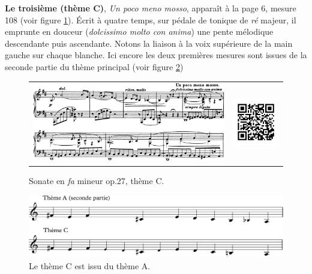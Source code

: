 \textbf{Le troisième (thème C)}, \emph{Un poco meno mosso}, apparaît à la page 6, mesure 108 (voir figure \ref{sonate-theme-3}). Écrit à quatre temps, sur pédale de tonique de \emph{ré} majeur, il emprunte en douceur (\emph{dolcissimo molto con anima}) une pente mélodique descendante puis ascendante. Notons la liaison à la voix supérieure de la main gauche sur chaque blanche. Ici encore les deux premières mesures sont issues de la seconde partie du thème principal (voir figure \ref{sonate-theme-1-vs-3})

\begin{figure}[!ht]
  \begin{bigcenter}
    \begin{tabular}{lr}
      \includegraphics[width=12.5cm, keepaspectratio]{sonate-theme-C.png}
      &
      \includegraphics[width=3cm, keepaspectratio]{op1-qr.png}
    \end{tabular}
  \end{bigcenter}
  \caption{\label{sonate-theme-3}Sonate en \emph{fa} mineur op.27, thème C.}
\end{figure}

\begin{figure}[!ht]
  \begin{bigcenter}
      \includegraphics[width=12.75cm, keepaspectratio]{sonate-theme-A-vs-C.pdf}\vspace{-0.5cm}
  \end{bigcenter}
  \caption{\label{sonate-theme-1-vs-3}Le thème C est issu du thème A.}
\end{figure}

